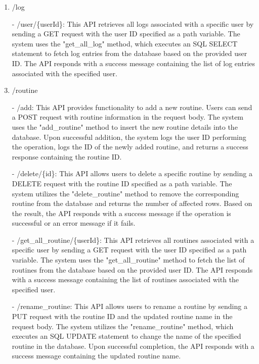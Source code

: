 \begin{enumerate}
                        \item /log
                        \item[-] /user/\{userId\}: This API retrieves all logs associated with a specific user by sending a GET request with the user ID specified as a path variable. The system uses the "get\_all\_log" method, which executes an SQL SELECT statement to fetch log entries from the database based on the provided user ID. The API responds with a success message containing the list of log entries associated with the specified user.\\

                        \item /routine
                        \item[-] /add: This API provides functionality to add a new routine. Users can send a POST request with routine information in the request body. The system uses the "add\_routine" method to insert the new routine details into the database. Upon successful addition, the system logs the user ID performing the operation, logs the ID of the newly added routine, and returns a success response containing the routine ID.\\
                        \item[-] /delete/\{id\}: This API allows users to delete a specific routine by sending a DELETE request with the routine ID specified as a path variable. The system utilizes the "delete\_routine" method to remove the corresponding routine from the database and returns the number of affected rows. Based on the result, the API responds with a success message if the operation is successful or an error message if it fails.\\
                        \item[-] /get\_all\_routine/\{userId\}: This API retrieves all routines associated with a specific user by sending a GET request with the user ID specified as a path variable. The system uses the "get\_all\_routine" method to fetch the list of routines from the database based on the provided user ID. The API responds with a success message containing the list of routines associated with the specified user.\\
                        \item[-] /rename\_routine: This API allows users to rename a routine by sending a PUT request with the routine ID and the updated routine name in the request body. The system utilizes the "rename\_routine" method, which executes an SQL UPDATE statement to change the name of the specified routine in the database. Upon successful completion, the API responds with a success message containing the updated routine name.\\

\end{enumerate}
